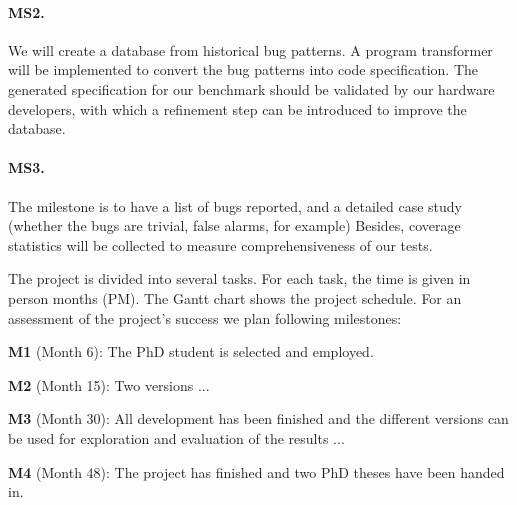\documentclass[fleqn,12pt]{article}
\begin{document}
\paragraph{MS2.} We will create  a database from historical  bug patterns.
A program transformer will be implemented to convert the bug patterns
into code specification. The generated specification for our benchmark
should be validated by our hardware developers, with which a
refinement step can be introduced to improve the database.

\paragraph{MS3.} The milestone  is to have a list of bugs reported, and a detailed case study (whether the bugs are
trivial, false alarms, for example) Besides, coverage statistics will
be collected to measure comprehensiveness of our tests.


The project is divided into several tasks.
For each task, the time is given in person months (PM). The Gantt chart shows
the project schedule.
For an assessment of the project's success we plan following milestones:

\textbf{M1} (Month 6): The PhD student is selected and employed.

\textbf{M2} (Month 15): Two versions ...

\textbf{M3} (Month 30): All development has been finished and the different versions
can be used for exploration and evaluation of the results ...

\textbf{M4} (Month 48): The project has finished and two PhD theses have been handed in.
\end{document}
